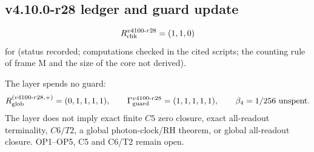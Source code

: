 \subsection*{v4.10.0-r28 ledger and guard update}
\label{subsec:v4100-r28-ledger-guard}

\[
R_{\rm chk}^{v4100\text{-}r28}=(1,1,0)
\]
for (status recorded; computations checked in the cited scripts; the counting rule of frame M and the size of the core not derived).

The layer spends no guard:
\[
R_{\rm glob}^{(v4100\text{-}r28,+)}=(0,1,1,1,1),
\qquad
\Gamma_{\rm guard}^{v4100\text{-}r28}=(1,1,1,1,1),
\qquad
\beta_4=1/256\ \text{unspent}.
\]
The layer does not imply exact finite \(C5\) zero closure, exact all-readout terminality, \(C6/T2\), a global photon-clock/RH theorem,
or global all-readout closure.  OP1--OP5, C5 and C6/T2 remain open.
